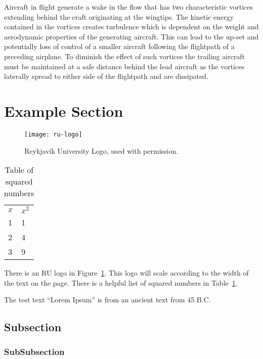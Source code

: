 Aircraft in flight generate a wake in the flow that has two characteristic vortices extending behind the craft originating at the wingtips. The kinetic energy contained in the vortices creates turbulence which is dependent on the weight and aerodynamic properties of the generating aircraft. This can lead to the up-set and potentially loss of control of a smaller aircraft following the flightpath of a preceding airplane. To diminish the effect of such vortices the trailing aircraft must be maintained at a safe distance behind the lead aircraft as the vortices  laterally spread to either side of the flightpath and are dissipated.


\section{Example Section}
\begin{figure}
  \centering
  \texttt{[image: ru-logo]}
  \caption[RU Logo]{Reykjavík University Logo, used with permission.}\label{fig:ru-logo}
\end{figure}
\begin{table}
  \centering
  \begin{tabular}{ll}
    $x$& $x^{2}$\\
    1 &1\\
    2 &4\\
    3 &9\\
  \end{tabular}
  \caption{Table of squared numbers}\label{tab:numbers}
\end{table}
There is an RU logo in Figure~\ref{fig:ru-logo}.
This logo will scale according to the width of the text on the page.
There is a helpful list of squared numbers in Table~\ref{tab:numbers}.

The test text ``Lorem Ipsum'' is from an ancient text from 45 B.C. \cite{cicero46deFinibus, lipsomwebsite}\\
\lipsum[1-5]
\subsection{Subsection}
\lipsum[6-10]
\subsubsection{SubSubsection}
\lipsum[11-15]
